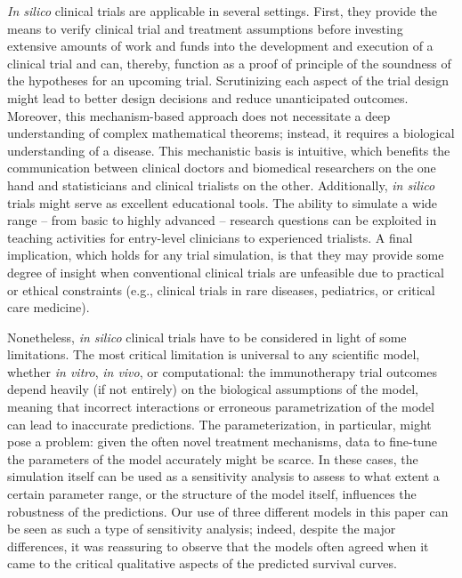 \documentclass[a4paper,10pt]{article}
\begin{document}
\emph{In silico} clinical trials are applicable in several settings. First, they
provide the means to verify clinical trial and treatment assumptions before
investing extensive amounts of work and funds into the development and
execution of a clinical trial and can, thereby, function as a proof of
principle of the soundness of the hypotheses for an upcoming trial.
Scrutinizing each aspect of the trial design might lead to better design decisions and
 reduce unanticipated outcomes. Moreover, this mechanism-based approach
does not necessitate a deep understanding of complex mathematical theorems;
instead, it requires a biological understanding of a disease. This mechanistic
basis is intuitive, which benefits the communication between clinical doctors
and biomedical researchers on the one hand and statisticians and clinical
trialists on the other. Additionally, \emph{in silico} trials might serve as excellent
educational tools. The ability to simulate a wide range -- from basic to highly
advanced -- research questions can be exploited in teaching activities for
entry-level clinicians to experienced trialists. A final implication, which
holds for any trial simulation, is that they may provide some degree of 
insight when conventional clinical trials are unfeasible due to practical or ethical
constraints (e.g., clinical trials in rare diseases, pediatrics, or critical
care medicine).

Nonetheless, \emph{in silico} clinical trials have to be considered in light of some
limitations. The most critical limitation is universal to any scientific model,
whether \emph{in vitro}, \emph{in vivo}, or computational: the immunotherapy trial
outcomes depend heavily (if not entirely) on the biological assumptions of the
model, meaning that incorrect interactions or erroneous parametrization of the
model can lead to inaccurate predictions. The parameterization, in particular,
might pose a problem: given the often novel treatment mechanisms, data to
fine-tune the parameters of the model accurately might be scarce. In these
cases, the simulation itself can be used as a sensitivity analysis to assess to
what extent a certain parameter range, or the structure of the model itself, 
influences the robustness of the predictions. Our use of three different models
in this paper can be seen as such a type of sensitivity analysis; indeed, despite
the major differences, it was reassuring to observe that the models often agreed
when it came to the critical qualitative aspects of the predicted survival curves.
\end{document}
